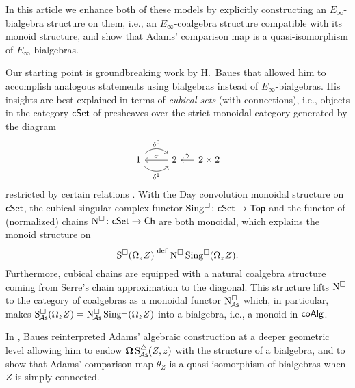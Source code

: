 In this article we enhance both of these models by explicitly constructing an $E_\infty$-bialgebra structure on them, i.e., an $E_\infty$-coalgebra structure compatible with its monoid structure, and show that Adams' comparison map is a quasi-isomorphism of $E_\infty$-bialgebras.

Our starting point is groundbreaking work by H.~Baues that allowed him to accomplish analogous statements using bialgebras instead of $E_\infty$-bialgebras.
His insights are best explained in terms of \textit{cubical sets} (with connections), i.e., objects in the category $\mathsf{cSet}$ of presheaves over the strict monoidal category generated by the diagram
\[
\begin{tikzcd}
1 \arrow[r, out=45, in=135, "\delta^0"] \arrow[r, out=-45, in=-135, "\delta^1"'] & 2 \arrow[l, "\sigma"'] &[-10pt] \arrow[l, "\gamma"'] 2 \times 2
\end{tikzcd}
\]
restricted by certain relations \cite{brown1981cubes}.
With the Day convolution monoidal structure on $\mathsf{cSet}$, the cubical singular complex functor $\operatorname{Sing^{\square}} \colon \mathsf{cSet} \to \mathsf{Top}$ and the functor of (normalized) chains $\operatorname{N^{\square}} \colon \mathsf{cSet} \to \mathsf{Ch}$ are both monoidal, which explains the monoid structure on
\[
\operatorname{S^{\square}}(\Omega_z Z) \stackrel{\mathrm{def}}{=} \operatorname{N^{\square}} \operatorname{Sing^{\square}}(\Omega_z Z).
\]
Furthermore, cubical chains are equipped with a natural coalgebra structure coming from Serre's chain approximation to the diagonal.
This structure lifts $\operatorname{N^{\square}}$ to the category of coalgebras as a monoidal functor $\operatorname{N^{\square}_{\!{\mathcal{A}\mathsf{s}}}}$ which, in particular, makes $\operatorname{S^{\square}_{\!{\mathcal{A}\mathsf{s}}}}(\Omega_z Z)=\operatorname{N^{\square}_{\!{\mathcal{A}\mathsf{s}}}}\operatorname{Sing^{\square}}(\Omega_z Z)$ into a bialgebra, i.e., a monoid in $\mathsf{coAlg}$.

In \cite{baues1998hopf}, Baues reinterpreted Adams' algebraic construction at a deeper geometric level allowing him to endow $\operatorname{\mathbf{\Omega}} \operatorname{S^{\triangle}_{\!{\mathcal{A}\mathsf{s}}}}(Z,z)$ with the structure of a bialgebra, and to show that Adams' comparison map $\theta_Z$ is a quasi-isomorphism of bialgebras when $Z$ is simply-connected.

